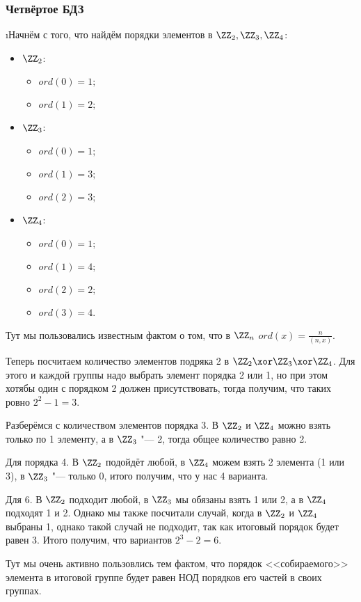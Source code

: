 \subsubsection{Четвёртое БДЗ}


\i Начнём с того, что найдём порядки элементов в $\ZZ_2, \ZZ_3, \ZZ_4$:
\begin{itemize}
    \item $\ZZ_2$:
    \begin{itemize}
        \item $ord(0) = 1;$
        \item $ord(1) = 2;$
    \end{itemize}
    \item $\ZZ_3$:
    \begin{itemize}
        \item $ord(0) = 1;$
        \item $ord(1) = 3;$
        \item $ord(2) = 3;$
    \end{itemize}
    \item $\ZZ_4$:
    \begin{itemize}
        \item $ord(0) = 1;$
        \item $ord(1) = 4;$
        \item $ord(2) = 2;$
        \item $ord(3) = 4.$
    \end{itemize}
\end{itemize}
Тут мы пользовались известным фактом о том, что в $\ZZ_n$ $ord(x) = \frac{n}{(n, x)}$.
\par Теперь посчитаем количество элементов подряка 2 в $\ZZ_2 \xor \ZZ_3 \xor \ZZ_4$. Для этого и каждой группы надо выбрать элемент порядка 2 или 1, но при этом хотябы один с порядком 2 должен присутствовать, тогда получим, что таких ровно $2^2 - 1 = 3$.
\par Разберёмся с количеством элементов порядка 3. В $\ZZ_2$ и $\ZZ_4$ можно взять только по 1 элементу, а в $\ZZ_3$ "--- 2, тогда общее количество равно 2.
\par Для порядка 4. В $\ZZ_2$ подойдёт любой, в $\ZZ_4$ можем взять 2 элемента (1 или 3), в $\ZZ_3$ "--- только 0, итого получим, что у нас 4 варианта.
\par Для 6. В $\ZZ_2$ подходит любой, в $\ZZ_3$ мы обязаны взять 1 или 2, а в $\ZZ_4$ подходят 1 и 2. Однако мы также посчитали случай, когда в $\ZZ_2$ и $\ZZ_4$ выбраны 1, однако такой случай не подходит, так как итоговый порядок будет равен 3. Итого получим, что вариантов $2^3 - 2 = 6$.
\par Тут мы очень активно пользовлись тем фактом, что порядок <<собираемого>> элемента в итоговой группе будет равен НОД порядков его частей в своих группах.


